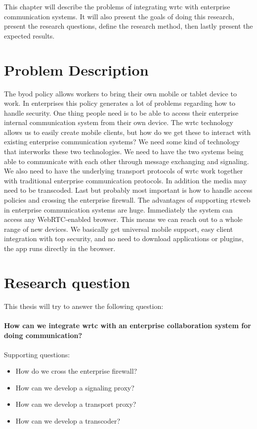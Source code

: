 
This chapter will describe the problems of integrating \gls{wrtc} with enterprise communication systems. It will also present the goals of doing this research, present the research questions, define the research method, then lastly present the expected results.

\section{Problem Description}
The \gls{byod} policy allows workers to bring their own mobile or tablet device to work. In enterprises this policy generates a lot of problems regarding how to handle security. One thing people need is to be able to access their enterprise internal communication system from their own device. The \gls{wrtc} technology allows us to easily create mobile clients, but how do we get these to interact with existing enterprise communication systems? We need some kind of technology that interworks these two technologies. We need to have the two systems being able to communicate with each other through message exchanging and signaling. We also need to have the underlying transport protocols of \gls{wrtc} work together with traditional enterprise communication protocols. In addition the media may need to be transcoded. Last but probably most important is how to handle access policies and crossing the enterprise firewall. The advantages of supporting \gls{rtcweb} in enterprise communication systems are huge. Immediately the system can access any WebRTC-enabled browser. This means we can reach out to a whole range of new devices. We basically get universal mobile support, easy client integration with top security, and no need to download applications or plugins, the app runs directly in the browser.

\section{Research question}
This thesis will try to answer the following question:
\\
\\
\textbf{How can we integrate \gls{wrtc} with an enterprise collaboration system for doing communication?}
\\
\\
Supporting questions:

\begin{itemize}
\item How do we cross the enterprise firewall?
\item How can we develop a signaling proxy?
\item How can we develop a transport proxy?
\item How can we develop a transcoder?
\end{itemize}

